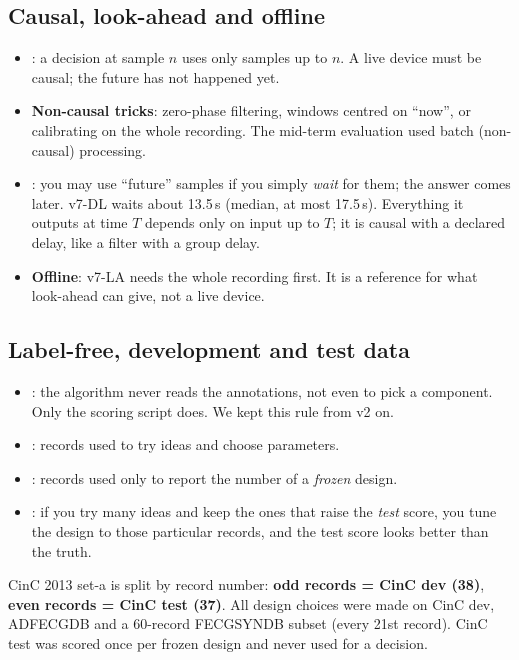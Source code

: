 \documentclass[11pt]{article}
\begin{document}
\subsection{Causal, look-ahead and offline}
\label{sec:causal}
\begin{itemize}
  \item {}: a decision at sample $n$ uses only samples up to $n$. A live device must be causal; the future has not happened yet.
  \item \textbf{Non-causal tricks}: zero-phase filtering, windows centred on ``now'', or calibrating on the whole recording. The mid-term evaluation used batch (non-causal) processing.
  \item {}: you may use ``future'' samples if you simply \emph{wait} for them; the answer comes later. v7-DL waits about 13.5\,s (median, at most 17.5\,s). Everything it outputs at time $T$ depends only on input up to $T$; it is causal with a declared delay, like a filter with a group delay.
  \item \textbf{Offline}: v7-LA needs the whole recording first. It is a reference for what look-ahead can give, not a live device.
\end{itemize}

\subsection{Label-free, development and test data}
\begin{itemize}
  \item {}: the algorithm never reads the annotations, not even to pick a component. Only the scoring script does. We kept this rule from v2 on.
  \item {}: records used to try ideas and choose parameters.
  \item {}: records used only to report the number of a \emph{frozen} design.
  \item {}: if you try many ideas and keep the ones that raise the \emph{test} score, you tune the design to those particular records, and the test score looks better than the truth.
\end{itemize}

\begin{keyfact}
CinC 2013 set-a is split by record number: \textbf{odd records = CinC dev (38)}, \textbf{even records = CinC test (37)}. All design choices were made on CinC dev, ADFECGDB and a 60-record FECGSYNDB subset (every 21st record). CinC test was scored once per frozen design and never used for a decision.
\end{keyfact}
\end{document}
